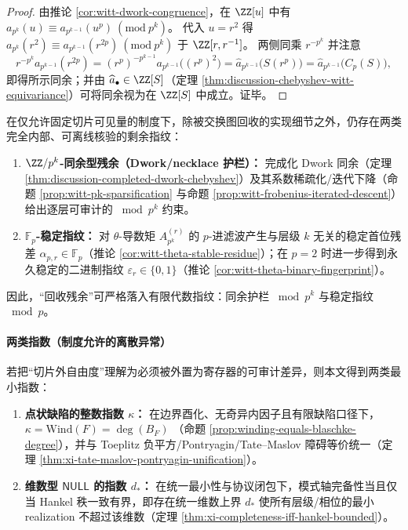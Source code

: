\begin{proof}
由推论 \ref{cor:witt-dwork-congruence}，在 \(\ZZ[u]\) 中有
\(
a_{p^k}(u)\equiv a_{p^{k-1}}(u^p)\ (\mathrm{mod}\ p^k)
\)。
代入 \(u=r^2\) 得
\(
a_{p^k}(r^2)\equiv a_{p^{k-1}}(r^{2p})\ (\mathrm{mod}\ p^k)
\) 于 \(\ZZ[r,r^{-1}]\)。
两侧同乘 \(r^{-p^k}\) 并注意
\[
r^{-p^k}a_{p^{k-1}}(r^{2p})
=(r^p)^{-p^{k-1}}a_{p^{k-1}}\!\bigl((r^p)^2\bigr)
=\widehat a_{p^{k-1}}\!\bigl(S(r^p)\bigr)
=\widehat a_{p^{k-1}}\!\bigl(C_p(S)\bigr),
\]
即得所示同余；并由 \(\widehat a_{\bullet}\in\ZZ[S]\)（定理 \ref{thm:discussion-chebyshev-witt-equivariance}）可将同余视为在 \(\ZZ[S]\) 中成立。证毕。
\end{proof}

\begin{corollary}\label{cor:discussion-recycling-residuals}
在仅允许固定切片可见量的制度下，除被交换图回收的实现细节之外，仍存在两类完全内部、可离线核验的剩余指纹：
\begin{enumerate}
  \item \textbf{\(\ZZ/p^k\)-同余型残余（Dwork/necklace 护栏）：}
  完成化 Dwork 同余（定理 \ref{thm:discussion-completed-dwork-chebyshev}）及其系数稀疏化/迭代下降（命题 \ref{prop:witt-pk-sparsification} 与命题 \ref{prop:witt-frobenius-iterated-descent}）给出逐层可审计的 \(\bmod p^k\) 约束。
  \item \textbf{\(\mathbb{F}_p\)-稳定指纹：}
  对 \(\theta\)-导数矩 \(A^{(r)}_{p^k}\) 的 \(p\)-进滤波产生与层级 \(k\) 无关的稳定首位残差 \(\alpha_{p,r}\in\mathbb{F}_p\)（推论 \ref{cor:witt-theta-stable-residue}）；在 \(p=2\) 时进一步得到永久稳定的二进制指纹 \(\varepsilon_r\in\{0,1\}\)（推论 \ref{cor:witt-theta-binary-fingerprint}）。
\end{enumerate}
因此，“回收残余”可严格落入有限代数指纹：同余护栏 \(\bmod p^k\) 与稳定指纹 \(\bmod p\)。
\end{corollary}

\paragraph{两类指数（制度允许的离散异常）}
若把“切片外自由度”理解为必须被外置为寄存器的可审计差异，则本文得到两类最小指数：
\begin{enumerate}
  \item \textbf{点状缺陷的整数指数 \(\kappa\)：}
  在边界酉化、无奇异内因子且有限缺陷口径下，
  \(\kappa=\mathrm{Wind}(F)=\deg(B_F)\)
  （命题 \ref{prop:winding-equals-blaschke-degree}），并与 Toeplitz 负平方/Pontryagin/Tate--Maslov 障碍等价统一（定理 \ref{thm:xi-tate-maslov-pontryagin-unification}）。
  \item \textbf{维数型 \(\mathsf{NULL}\) 的指数 \(d_\ast\)：}
  在统一最小性与协议闭包下，模式轴完备性当且仅当 Hankel 秩一致有界，即存在统一维数上界 \(d_\ast\) 使所有层级/相位的最小 realization 不超过该维数（定理 \ref{thm:xi-completeness-iff-hankel-bounded}）。
\end{enumerate}

